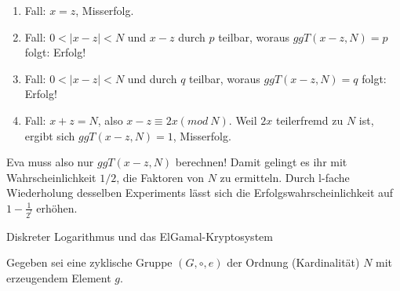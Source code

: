 \documentclass[10pt, a4paper]{exam}
\begin{document}
\begin{questions}
\begin{parts}
\begin{solution}
      \begin{enumerate}
          \item Fall: $x=z$, Misserfolg.
          \item Fall: $0<|x-z|< N$ und $x-z$ durch $p$ teilbar, woraus $ggT(x-z,N) =p$ folgt: Erfolg!
          \item Fall: $0<|x-z|< N$ und durch $q$ teilbar, woraus $ggT(x-z,N) =q$ folgt: Erfolg!
          \item Fall: $x+z=N$, also $x-z\equiv 2x(mod\ N)$. Weil $2x$ teilerfremd zu $N$ ist, ergibt sich $ggT(x-z,N)=1$, Misserfolg.
      \end{enumerate}

      Eva muss also nur $ggT(x-z,N)$ berechnen! Damit gelingt es ihr mit Wahrscheinlichkeit $1/2$, die Faktoren von $N$ zu ermitteln. Durch l-fache Wiederholung desselben Experiments lässt sich die Erfolgswahrscheinlichkeit auf $1-\frac{1}{2^l}$ erhöhen.
    \end{solution}
  \end{parts}

  \question Diskreter Logarithmus und das ElGamal-Kryptosystem

  Gegeben sei eine zyklische Gruppe $(G,\circ,e)$ der Ordnung (Kardinalität) $N$ mit erzeugendem Element $g$.
\end{questions}
\end{document}

